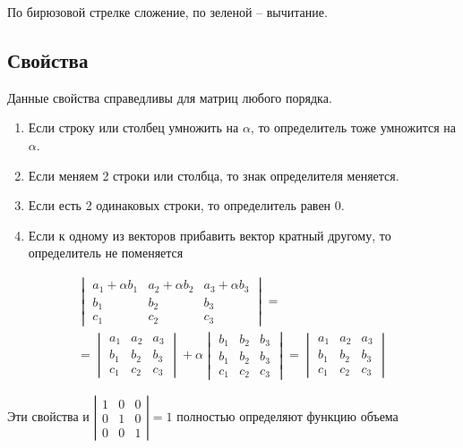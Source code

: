 \documentclass[main]{subfiles}
\begin{document}
По бирюзовой стрелке сложение, по зеленой -- вычитание.

\subsection{Свойства}
\begin{remark}
    Данные свойства справедливы для матриц любого порядка.
\end{remark}
\begin{enumerate}
    \item Если  строку или столбец умножить на $\alpha$, то определитель тоже
          умножится на $\alpha$.
    \item Если меняем 2 строки или столбца, то знак определителя меняется.
    \item Если есть 2 одинаковых строки, то определитель равен 0.
    \item Если к одному из векторов прибавить вектор кратный другому,
          то определитель не поменяется
\end{enumerate}
\begin{multline*}
    \begin{vmatrix}
        a_1 + \alpha b_1 & a_2+ \alpha b_2 & a_3 + \alpha b_3 \\
        b_1              & b_2             & b_3              \\
        c_1              & c_2             & c_3
    \end{vmatrix}=\\
    =\begin{vmatrix}
        a_1 & a_2 & a_3 \\
        b_1 & b_2 & b_3 \\
        c_1 & c_2 & c_3
    \end{vmatrix}+ \alpha
    \begin{vmatrix}
        b_1 & b_2 & b_3 \\
        b_1 & b_2 & b_3 \\
        c_1 & c_2 & c_3
    \end{vmatrix}=
    \begin{vmatrix}
        a_1 & a_2 & a_3 \\
        b_1 & b_2 & b_3 \\
        c_1 & c_2 & c_3
    \end{vmatrix}
\end{multline*}
\begin{assertion}
    Эти свойства и $\left| \begin{smallmatrix}
            1 & 0 &0\\
            0& 1& 0\\
            0&0&1
        \end{smallmatrix} \right| = 1$
    полностью определяют функцию объема
\end{assertion}
\end{document}
